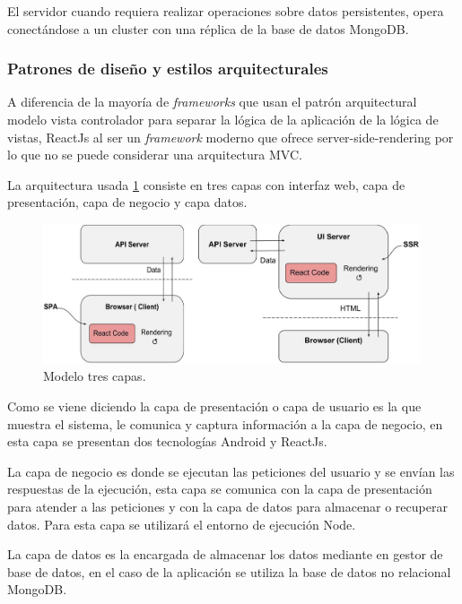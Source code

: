 \documentclass{article}
\begin{document}
El servidor cuando requiera realizar operaciones sobre datos persistentes, opera conectándose a un cluster con una réplica de la base de datos MongoDB.

\pagebreak

\subsubsection*{Patrones de diseño y estilos arquitecturales}

A diferencia de la mayoría de \textit{frameworks} que usan el patrón arquitectural modelo vista controlador para separar la lógica de la aplicación de la lógica de vistas, ReactJs al ser un \textit{framework} moderno que ofrece server-side-rendering por lo que no se puede considerar una arquitectura MVC.
 
La arquitectura usada \ref{patron} consiste en tres capas con interfaz web, capa de presentación, capa de negocio y capa datos.

\begin{figure}[H]
    \centering
        \includegraphics[width=0.99\textwidth]{../images/patron.jpg}
    \caption{Modelo tres capas.}
    \label{patron}
\end{figure}

Como se viene diciendo la capa de presentación o capa de usuario es la que muestra el sistema, le comunica y captura información a la capa de negocio, en esta capa se presentan dos tecnologías Android y ReactJs.
 
La capa de negocio es donde se ejecutan las peticiones del usuario y se envían las respuestas de la ejecución, esta capa se comunica con la capa de presentación para atender a las peticiones y con la capa de datos para almacenar o recuperar datos. Para esta capa se utilizará el entorno de ejecución Node.
 
La capa de datos es la encargada de almacenar los datos mediante en gestor de base de datos, en el caso de la aplicación se utiliza la base de datos no relacional MongoDB.
\end{document}
